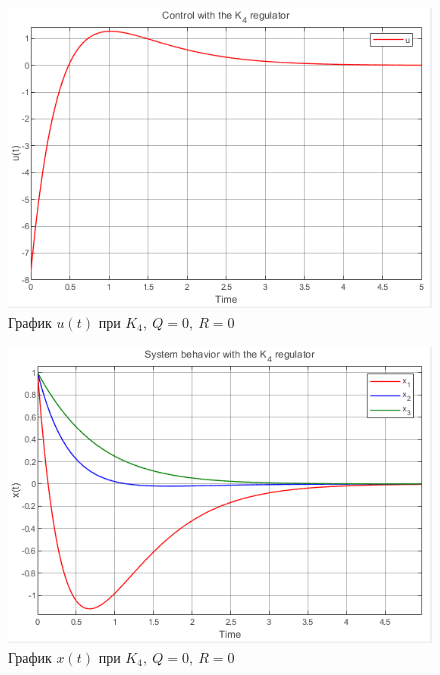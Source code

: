 \documentclass[a4paper, 12pt]{article}
\begin{document}
    \begin{figure}[H]
        \centering
        \includegraphics{3task_K4_u.png}
        \captionsetup{skip=0pt}
        \caption{График $u(t)$ при $K_4,\ Q=0,\ R=0$}
        \label{fig:3task_K4_u}
    \end{figure}
    \begin{figure}[H]
        \centering
        \includegraphics{3task_K4_x.png}
        \captionsetup{skip=0pt}
        \caption{График $x(t)$ при $K_{4},\ Q=0,\ R=0$}
        \label{fig:3task_K4_x}
    \end{figure}
    \newpage
    \vspace*{0.01mm}
\end{document}
